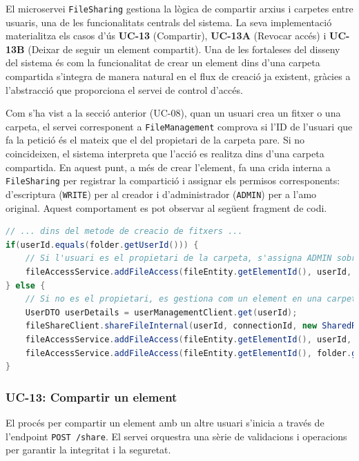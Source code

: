 El microservei \texttt{FileSharing} gestiona la lògica de compartir arxius i carpetes entre usuaris, una de les funcionalitats centrals del sistema. La seva implementació materialitza els casos d'ús \textbf{UC-13} (Compartir), \textbf{UC-13A} (Revocar accés) i \textbf{UC-13B} (Deixar de seguir un element compartit). Una de les fortaleses del disseny del sistema és com la funcionalitat de crear un element dins d'una carpeta compartida s'integra de manera natural en el flux de creació ja existent, gràcies a l'abstracció que proporciona el servei de control d'accés.

Com s'ha vist a la secció anterior (UC-08), quan un usuari crea un fitxer o una carpeta, el servei corresponent a \texttt{FileManagement} comprova si l'ID de l'usuari que fa la petició és el mateix que el del propietari de la carpeta pare. Si no coincideixen, el sistema interpreta que l'acció es realitza dins d'una carpeta compartida. En aquest punt, a més de crear l'element, fa una crida interna a \texttt{FileSharing} per registrar la compartició i assignar els permisos corresponents: d'escriptura (\texttt{WRITE}) per al creador i d'administrador (\texttt{ADMIN}) per a l'amo original. Aquest comportament es pot observar al següent fragment de codi.

\begin{lstlisting}[language=Java, caption={Gestió de permisos en crear un fitxer a `FileService`}]
// ... dins del metode de creacio de fitxers ...
if(userId.equals(folder.getUserId())) {
    // Si l'usuari es el propietari de la carpeta, s'assigna ADMIN sobre el nou fitxer
    fileAccessService.addFileAccess(fileEntity.getElementId(), userId, AccessType.ADMIN);
} else {
    // Si no es el propietari, es gestiona com un element en una carpeta compartida
    UserDTO userDetails = userManagementClient.get(userId);
    fileShareClient.shareFileInternal(userId, connectionId, new SharedRequest(file.getElementId(), folder.getElementId(), userDetails.getUsername(), AccessType.WRITE));
    fileAccessService.addFileAccess(fileEntity.getElementId(), userId, AccessType.WRITE);
    fileAccessService.addFileAccess(fileEntity.getElementId(), folder.getUserId(), AccessType.ADMIN);
}
\end{lstlisting}

\subsubsection{UC-13: Compartir un element}

El procés per compartir un element amb un altre usuari s'inicia a través de l'endpoint \texttt{POST /share}. El servei orquestra una sèrie de validacions i operacions per garantir la integritat i la seguretat.

